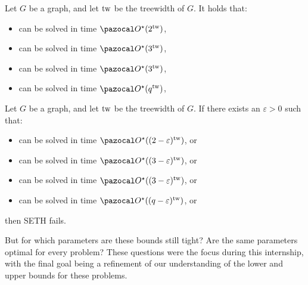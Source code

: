 \begin{theorem}
    \label{theorem:treewidth-algo}
    Let $G$ be a graph, and let $\text{tw}$ be the treewidth of $G$. It holds that:
    \begin{itemize}
        \item {} can be solved in time $\O^\star(2^{\tw})$,
        \item {} can be solved in time $\O^\star(3^{\tw})$,
        \item {} can be solved in time $\O^\star(3^{\tw})$,
        \item {} can be solved in time $\O^\star(q^{\tw})$,
    \end{itemize}
\end{theorem}

\begin{theorem}
    \label{theorem:treewidth-bound}
    Let $G$ be a graph, and let $\text{tw}$ be the treewidth of $G$. If there exists an $\varepsilon > 0$ such that:
    \begin{itemize}
        \item {} can be solved in time $\O^\star((2-\varepsilon)^{\tw})$, or
        \item {} can be solved in time $\O^\star((3-\varepsilon)^{\tw})$, or
        \item {} can be solved in time $\O^\star((3-\varepsilon)^{\tw})$, or
        \item {} can be solved in time $\O^\star((q-\varepsilon)^{\tw})$, or
    \end{itemize}
    then SETH fails.
\end{theorem}

But for which parameters are these bounds still tight? Are the same parameters optimal for every problem? These questions were the focus during this internship, with the final goal being a refinement of our understanding of the lower and upper bounds for these problems.

